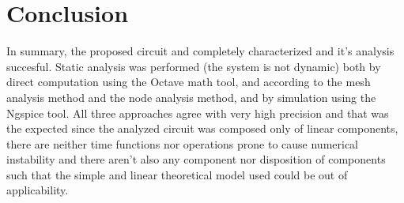 \section{Conclusion}
\label{sec:conclusion}

In summary, the proposed circuit and completely characterized and it's analysis succesful. Static analysis was performed (the system is not dynamic) both by direct computation using the Octave math tool, and according to the mesh analysis method and the node analysis method, and by simulation using the Ngspice tool. All three approaches agree with very high precision and that was the expected since the analyzed circuit was composed only of linear components, there are neither time functions nor operations prone to cause numerical instability and there aren’t also any component nor disposition of components such that the simple and linear theoretical model used could be out of applicability.


